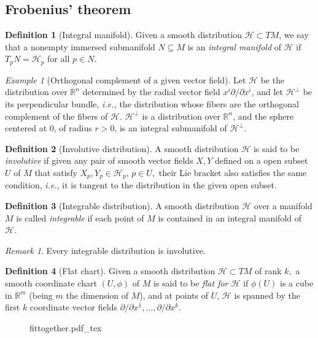 \documentclass [xcolor=svgnames, t] {beamer}
\newcommand{\incfig}[2][1]{%
    \def\svgwidth{#1\columnwidth}
    {#2.pdf_tex}
}
\theoremstyle{definition}
\newtheorem{df}{Definition}
\theoremstyle{plain}
\theoremstyle{remark}
\newtheorem{ex}{Example}
\newtheorem{rem}{Remark}
\begin{document}
\subsection{Frobenius' theorem}
\begin{frame}[fragile]
	\begin{df}[Integral manifold]
	Given a smooth distribution $ \mathcal{H} \subset TM$, we say that a nonempty immersed submanifold $ N\subseteq M $  is an \textit{integral manifold} of $\mathcal{H}$ if $ T_p N = \mathcal{H}_p $ for all $ p\in N $.
\end{df}
\begin{ex}[Orthogonal complement of a given vector field]
Let $ \mathcal{H} $ be the distribution over $ \mathbb{R}^n $ determined by the radial vector field $ x^i \partial / \partial x^i $, and let $ \mathcal{H}^\perp $ be its perpendicular bundle, \textit{i.e.,} the distribution whose fibers are the orthogonal complement of the fibers of $ \mathcal{H}. $ $ \mathcal{H}^\perp $ is a distribution over $ \mathbb{R}^n  $, and the sphere centered at $0$, of radius $r>0$, is an integral submanifold of $ \mathcal{H}^\perp. $        
\end{ex}

\end{frame}

\begin{frame}[fragile]
	\begin{df}[Involutive distribution]
A smooth distribution $ \mathcal{H} $ is said to be \textit{involutive} if given any pair of smooth vector fields $ X,Y $ defined on a open subset $ U $  of $ M $  that satisfy $X_p,Y_p\in \mathcal{H}_p $, $ p\in U, $ their Lie bracket also satisfies the same condition, \textit{i.e.}, it is tangent to the distribution in the given open subset. 
\end{df}
\begin{df}[Integrable distribution]
	A smooth distribution $ \mathcal{H} $ over a manifold $ M $ is called \textit{integrable} if each point of $ M $ is contained in an integral manifold of $ \mathcal{H}. $  
\end{df}
\begin{rem}
Every integrable distribution is involutive.	
\end{rem}
\end{frame}

\begin{frame}[fragile]
	\begin{df}[Flat chart]
	Given a smooth distribution $ \mathcal{H}\subset TM $  of rank $ k, $ a smooth coordinate chart $ (U,\phi) $ of $ M $ is said to be \textit{flat for $ \mathcal{H} $ } if $ \phi(U) $ is a cube in $ \mathbb{R}^m  $ (being $ m $ the dimension of $ M $), and at points of $ U $, $ \mathcal{H} $ is spanned by the first $ k $ coordinate vector fields $ \partial/\partial x^1,\dots,\partial/\partial x^k $.
\end{df}
	
\begin{figure}
    \centering
    \incfig[0.9]{fittogether}
    \label{fig:fittogether}
\end{figure}
\end{frame}
\end{document}
